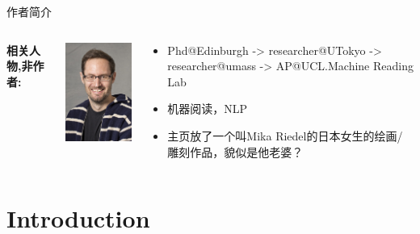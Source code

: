 \documentclass[color=usenames,dvipsnames]{beamer}
\begin{document}
\begin{frame}{作者简介}
\begin{columns}
   \column{0.35\hsize}
   \begin{columns}
   \column{0.3\hsize}
   \alert{\textbf{ 相关人物,非作者: }}
   \column{0.8\hsize}
   \begin{center}
     \includegraphics[width=0.35\hsize]{pic/Riedel.jpg}
   \end{center}
   \end{columns}
     \begin{block}{}
      \begin{itemize}
       \item Phd@Edinburgh -> researcher@UTokyo -> researcher@umass -> AP@UCL.Machine Reading Lab
       \item 机器阅读，NLP
       \item 主页放了一个叫Mika Riedel的日本女生的绘画/雕刻作品，貌似是他老婆？
      \end{itemize}
     \end{block}
  \end{columns}

\end{frame}


\section{Introduction}
\end{document}
